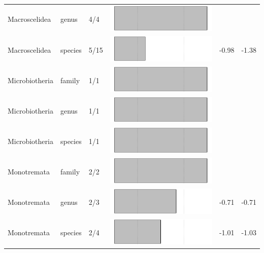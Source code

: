 \begin{longtable}{lL{1.8cm}C{2cm}ccc}
  Macroscelidea & genus & 4/4 & \includegraphics[width=0.20\linewidth, height=0.05\linewidth]{Missing_mammals/Table_figures/bar38.pdf} &   &   \\ 
  Macroscelidea & species & 5/15 & \includegraphics[width=0.20\linewidth, height=0.05\linewidth]{Missing_mammals/Table_figures/bar39.pdf} & -0.98 & -1.38 \\ 
  Microbiotheria & family & 1/1 & \includegraphics[width=0.20\linewidth, height=0.05\linewidth]{Missing_mammals/Table_figures/bar40.pdf} &   &   \\ 
  Microbiotheria & genus & 1/1 & \includegraphics[width=0.20\linewidth, height=0.05\linewidth]{Missing_mammals/Table_figures/bar41.pdf} &   &   \\ 
  Microbiotheria & species & 1/1 & \includegraphics[width=0.20\linewidth, height=0.05\linewidth]{Missing_mammals/Table_figures/bar42.pdf} &   &   \\ 
  Monotremata & family & 2/2 & \includegraphics[width=0.20\linewidth, height=0.05\linewidth]{Missing_mammals/Table_figures/bar43.pdf} &   &   \\ 
  Monotremata & genus & 2/3 & \includegraphics[width=0.20\linewidth, height=0.05\linewidth]{Missing_mammals/Table_figures/bar44.pdf} & -0.71 & -0.71 \\ 
  Monotremata & species & 2/4 & \includegraphics[width=0.20\linewidth, height=0.05\linewidth]{Missing_mammals/Table_figures/bar45.pdf} & -1.01 & -1.03 \\ 

\end{longtable}
